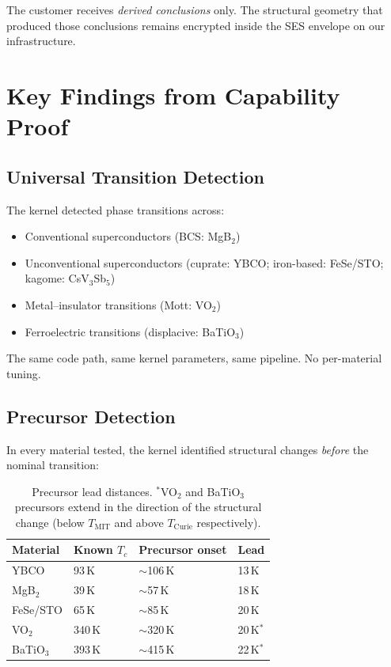 \documentclass[11pt,letterpaper]{article}
\begin{document}
The customer receives \emph{derived conclusions} only. The structural
geometry that produced those conclusions remains encrypted inside the
SES envelope on our infrastructure.

\section{Key Findings from Capability Proof}

\subsection{Universal Transition Detection}

The kernel detected phase transitions across:
\begin{itemize}
  \item Conventional superconductors (BCS: MgB$_2$)
  \item Unconventional superconductors (cuprate: YBCO; iron-based: FeSe/STO;
    kagome: CsV$_3$Sb$_5$)
  \item Metal--insulator transitions (Mott: VO$_2$)
  \item Ferroelectric transitions (displacive: BaTiO$_3$)
\end{itemize}

The same code path, same kernel parameters, same pipeline. No
per-material tuning.

\subsection{Precursor Detection}

In every material tested, the kernel identified structural changes
\emph{before} the nominal transition:

\begin{table}[h]
\centering
\begin{tabular}{@{}llll@{}}
\toprule
\textbf{Material} & \textbf{Known $T_c$} & \textbf{Precursor onset} &
  \textbf{Lead} \\
\midrule
YBCO & 93\,K & $\sim$106\,K & 13\,K \\
MgB$_2$ & 39\,K & $\sim$57\,K & 18\,K \\
FeSe/STO & 65\,K & $\sim$85\,K & 20\,K \\
VO$_2$ & 340\,K & $\sim$320\,K & 20\,K$^*$ \\
BaTiO$_3$ & 393\,K & $\sim$415\,K & 22\,K$^*$ \\
\bottomrule
\end{tabular}
\caption{Precursor lead distances. $^*$VO$_2$ and BaTiO$_3$ precursors
extend in the direction of the structural change (below $T_{\text{MIT}}$
and above $T_{\text{Curie}}$ respectively).}
\end{table}
\end{document}
